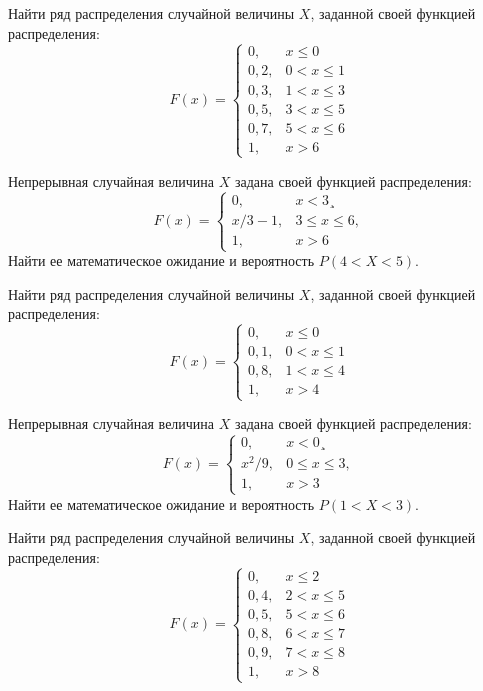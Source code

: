 \vfill

\newpage\setcounter{zad}{0}

\z Найти ряд распределения случайной величины $X$, заданной своей функцией распределения: $$ F(x) = \begin{cases}0, & x \leqslant 0 \\ 0{,}2, & 0 < x \leqslant 1 \\ 0{,}3, & 1 < x \leqslant 3 \\ 0{,}5, & 3 < x \leqslant 5 \\ 0{,}7, & 5 < x \leqslant 6 \\ 1, & x > 6 \end{cases} $$


\vfill

\z Непрерывная случайная величина $X$ задана своей функцией распределения: $$ F(x) = \begin{cases}0, & x < 3¸\\ x/3-1, & 3 \leqslant x \leqslant 6, \\ 1, & x > 6 \end{cases} $$ Найти ее математическое ожидание и вероятность $P(4 < X < 5)$.
 

\vfill

\newpage\setcounter{zad}{0}

\z Найти ряд распределения случайной величины $X$, заданной своей функцией распределения: $$ F(x) = \begin{cases}0, & x \leqslant 0 \\ 0{,}1, & 0 < x \leqslant 1 \\ 0{,}8, & 1 < x \leqslant 4 \\ 1, & x > 4 \end{cases} $$


\vfill

\z Непрерывная случайная величина $X$ задана своей функцией распределения: $$ F(x) = \begin{cases}0, & x < 0¸\\ x^2/9, & 0 \leqslant x \leqslant 3, \\ 1, & x > 3 \end{cases} $$ Найти ее математическое ожидание и вероятность $P(1 < X < 3)$.
 

\vfill

\newpage\setcounter{zad}{0}

\z Найти ряд распределения случайной величины $X$, заданной своей функцией распределения: $$ F(x) = \begin{cases}0, & x \leqslant 2 \\ 0{,}4, & 2 < x \leqslant 5 \\ 0{,}5, & 5 < x \leqslant 6 \\ 0{,}8, & 6 < x \leqslant 7 \\ 0{,}9, & 7 < x \leqslant 8 \\ 1, & x > 8 \end{cases} $$


